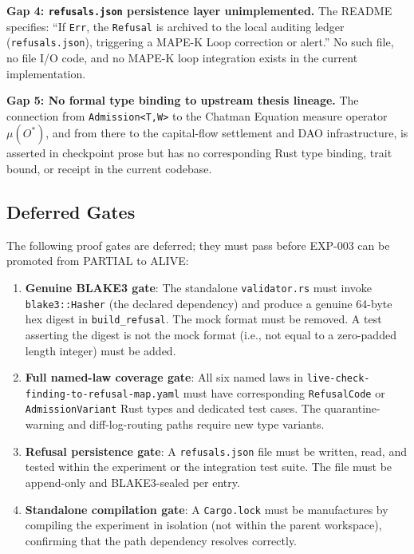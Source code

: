 \textbf{Gap 4: \texttt{refusals.json} persistence layer unimplemented.}
The README specifies: ``If \texttt{Err}, the \texttt{Refusal} is archived to the
local auditing ledger (\texttt{refusals.json}), triggering a MAPE-K Loop correction
or alert.'' No such file, no file I/O code, and no MAPE-K loop integration exists
in the current implementation.

\textbf{Gap 5: No formal type binding to upstream thesis lineage.}
The connection from \texttt{Admission<T,W>} to the Chatman Equation measure operator
$\mu(O^*)$, and from there to the capital-flow settlement and DAO infrastructure,
is asserted in checkpoint prose but has no corresponding Rust type binding, trait
bound, or receipt in the current codebase.

\subsection{Deferred Gates}
\label{sec:otel-weaver-exp-003-live-check-to-refusal-open-deferred}

The following proof gates are deferred; they must pass before EXP-003 can be
promoted from PARTIAL to ALIVE:

\begin{enumerate}
  \item \textbf{Genuine BLAKE3 gate}: The standalone \texttt{validator.rs} must
        invoke \texttt{blake3::Hasher} (the declared dependency) and produce a
        genuine 64-byte hex digest in \texttt{build\_refusal}. The mock format must
        be removed. A test asserting the digest is not the mock format (i.e., not
        equal to a zero-padded length integer) must be added.
  \item \textbf{Full named-law coverage gate}: All six named laws in
        \texttt{live-check-finding-to-refusal-map.yaml} must have corresponding
        \texttt{RefusalCode} or \texttt{AdmissionVariant} Rust types and dedicated
        test cases. The quarantine-warning and diff-log-routing paths require new
        type variants.
  \item \textbf{Refusal persistence gate}: A \texttt{refusals.json} file must be
        written, read, and tested within the experiment or the integration test suite.
        The file must be append-only and BLAKE3-sealed per entry.
  \item \textbf{Standalone compilation gate}: A \texttt{Cargo.lock} must be
        manufactures by compiling the experiment in isolation (not within the parent
        workspace), confirming that the path dependency resolves correctly.
\end{enumerate}

